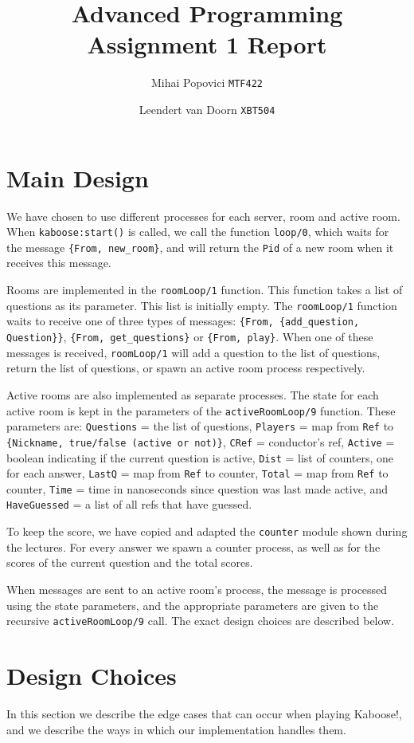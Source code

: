 \documentclass{article}
\title{Advanced Programming Assignment 1 Report}
\author{Mihai Popovici \texttt{MTF422} \and Leendert van Doorn \texttt{XBT504}}
\begin{document}
\maketitle	

\section{Main Design}
We have chosen to use different processes for each server, room and active room. When \texttt{kaboose:start()} is called, we call the function \texttt{loop/0}, which waits for the message \texttt{\{From, new\_room\}}, and will return the \texttt{Pid} of a new room when it receives this message.

Rooms are implemented in the \texttt{roomLoop/1} function. This function takes a list of questions as its parameter. This list is initially empty. The \texttt{roomLoop/1} function waits to receive one of three types of messages: \texttt{\{From, \{add\_question, Question\}\}}, \texttt{\{From, get\_questions\}} or \texttt{\{From, play\}}. When one of these messages is received, \texttt{roomLoop/1} will add a question to the list of questions, return the list of questions, or spawn an active room process respectively.

Active rooms are also implemented as separate processes. The state for each active room is kept in the parameters of the \texttt{activeRoomLoop/9} function. These parameters are: \texttt{Questions} = the list of questions, \texttt{Players} = map from \texttt{Ref} to \texttt{\{Nickname, true/false (active or not)\}}, \texttt{CRef} = conductor's ref, \texttt{Active} = boolean indicating if the current question is active, \texttt{Dist} = list of counters, one for each answer, \texttt{LastQ} = map from \texttt{Ref} to counter, \texttt{Total} = map from \texttt{Ref} to counter, \texttt{Time} = time in nanoseconds since question was last made active, and \texttt{HaveGuessed} = a list of all refs that have guessed.

To keep the score, we have copied and adapted the \texttt{counter} module shown during the lectures. For every answer we spawn a counter process, as well as for the scores of the current question and the total scores.

When messages are sent to an active room's process, the message is processed using the state parameters, and the appropriate parameters are given to the recursive \texttt{activeRoomLoop/9} call. The exact design choices are described below.

\section{Design Choices}
In this section we describe the edge cases that can occur when playing Kaboose!, and we describe the ways in which our implementation handles them.
\end{document}
